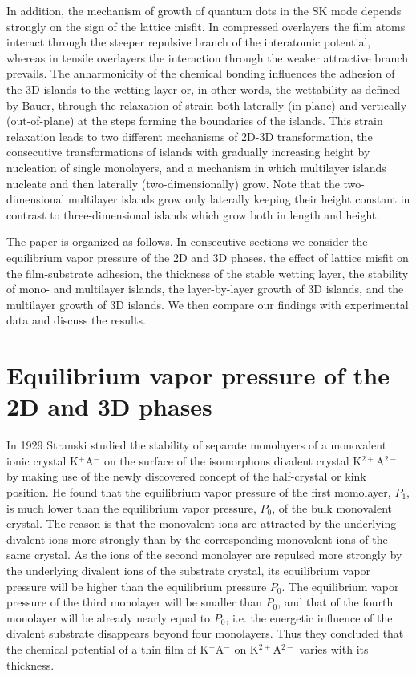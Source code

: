 \documentclass[aps,prl,showpacs,twocolumn,byrevtex,floatfix]{revtex4-1}
\begin{document}
In addition, the mechanism of growth of quantum dots in the SK mode depends
strongly on the sign of the lattice misfit. In compressed overlayers the film
atoms interact through the steeper repulsive branch of the interatomic
potential, whereas in tensile overlayers the interaction through the
weaker attractive branch prevails. The anharmonicity of the chemical bonding
influences the adhesion of the 3D islands to the wetting layer or, in other
words, the wettability as defined by Bauer, through the relaxation of strain
both laterally (in-plane) and vertically (out-of-plane) at the steps
forming the boundaries of the islands. This strain relaxation leads to two
different mechanisms of 2D-3D transformation, the consecutive transformations of
islands with gradually increasing height by nucleation of single monolayers,
and a mechanism in which multilayer islands nucleate and then laterally 
(two-dimensionally) grow. 
Note that the two-dimensional multilayer islands grow only laterally
keeping their height constant in contrast to three-dimensional islands which
grow both in length and height.

The paper is organized as follows. In consecutive sections we consider the
equilibrium vapor pressure of the 2D and 3D phases, the effect of lattice misfit
on the film-substrate adhesion, the thickness of the stable wetting layer, the
stability of mono- and multilayer islands, the layer-by-layer growth of 3D
islands, and the multilayer growth of 3D islands. We then compare our findings
with experimental data and discuss the results.


\section{Equilibrium vapor pressure of the 2D and 3D phases}

In 1929 Stranski\cite{Stranski129,Stranski229} studied the stability of 
separate monolayers of a monovalent ionic crystal K$^+$A$^-$ on the surface 
of the isomorphous divalent crystal K$^{2+}$A$^{2-}$ by making use of 
the newly discovered concept of the half-crystal or kink 
position.\cite{Kossel27,Stranski27,Stranski28} He found that the 
equilibrium vapor pressure of the first momolayer, $P_1$, is much
lower than the equilibrium vapor pressure, $P_0$, of the bulk monovalent
crystal. The reason is that the monovalent ions are attracted by the underlying
divalent ions more strongly than by the corresponding monovalent ions of the
same crystal. As the ions of the second monolayer are repulsed more strongly by
the underlying divalent ions of the substrate crystal, its equilibrium vapor
pressure will be higher than the equilibrium pressure $P_0$. The equilibrium
vapor pressure of the third monolayer will be smaller than $P_0$, and that of
the fourth monolayer will be already nearly equal to $P_0$, i.e. the 
energetic influence of the divalent substrate disappears beyond 
four monolayers. Thus they concluded
that the chemical potential of a thin film of K$^+$A$^-$ on K$^{2+}$A$^{2-}$
varies with its thickness.
\end{document}
